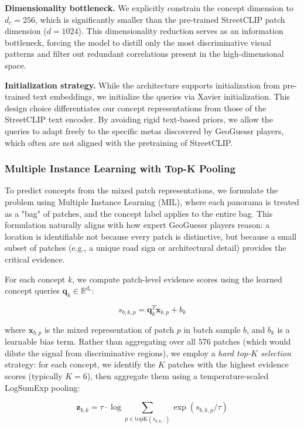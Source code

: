 \documentclass{article}
\newcommand{\logits}{\mathbf{z}}
\begin{document}
\textbf{Dimensionality bottleneck.} We explicitly constrain the concept dimension to $d_c = 256$, which is significantly smaller than the pre-trained StreetCLIP patch dimension ($d = 1024$). This dimensionality reduction serves as an information bottleneck, forcing the model to distill only the most discriminative visual patterns and filter out redundant correlations present in the high-dimensional space.

\textbf{Initialization strategy.} While the architecture supports initialization from pre-trained text embeddings, we initialize the queries via Xavier initialization. This design choice differentiates our concept representations from those of the StreetCLIP text encoder. By avoiding rigid text-based priors, we allow the queries to adapt freely to the specific metas discovered by GeoGuessr players, which often are not aligned with the pretraining of StreetCLIP.
\subsubsection{Multiple Instance Learning with Top-K Pooling}

To predict concepts from the mixed patch representations, we formulate the problem using Multiple Instance Learning (MIL), where each panorama is treated as a "bag" of patches, and the concept label applies to the entire bag. This formulation naturally aligns with how expert GeoGuessr players reason: a location is identifiable not because every patch is distinctive, but because a small subset of patches (e.g., a unique road sign or architectural detail) provides the critical evidence.

For each concept $k$, we compute patch-level evidence scores using the learned concept queries $\mathbf{q}_k \in \mathbb{R}^{d_c}$:

\begin{equation}
s_{b,k,p} = \mathbf{q}_k^T \mathbf{x}_{b,p} + b_k
\end{equation}

where $\mathbf{x}_{b,p}$ is the mixed representation of patch $p$ in batch sample $b$, and $b_k$ is a learnable bias term. Rather than aggregating over all 576 patches (which would dilute the signal from discriminative regions), we employ a \textit{hard top-$K$ selection} strategy: for each concept, we identify the $K$ patches with the highest evidence scores (typically $K=6$), then aggregate them using a temperature-scaled LogSumExp pooling:

\begin{equation}
\logits_{b,k} = \tau \cdot \log \sum_{p \in \text{topK}(s_{b,k,:})} \exp(s_{b,k,p} / \tau)
\end{equation}
\end{document}
